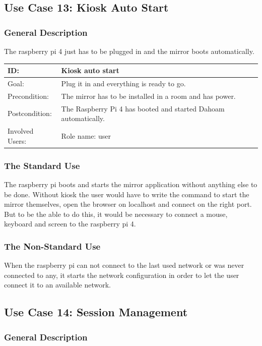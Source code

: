 \documentclass[12pt]{article}
\theoremstyle{definition}
\begin{document}
\subsection{Use Case 13: Kiosk Auto Start}
\subsubsection{General Description}
The raspberry pi 4 just has to be plugged in and the mirror boots automatically. \\

\begin{tabular}{|p{.2\linewidth}|p{.65\linewidth}|}
\hline 
ID: & Kiosk auto start\\ \hline
Goal: & Plug it in and everything is ready to go. \\ \hline
Precondition: & The mirror has to be installed in a room and has power. \\ \hline
Postcondition: &  The Raspberry Pi 4 has booted and started Dahoam automatically.\\ \hline
Involved Users: & Role name: user \\ \hline
\end{tabular}

\subsubsection{The Standard Use}
The raspberry pi boots and starts the mirror application without anything else to be done. Without kiosk the user would have to write the command to start the mirror themselves, open the browser on localhost and connect on the right port. But to be the able to do this, it would be necessary to connect a mouse, keyboard and screen to the  raspberry pi 4.

\subsubsection{The Non-Standard Use}
When the raspberry pi can not connect to the last used network or was never connected to any, it starts the network configuration in order to let the user connect it to an available network. 

\subsection{Use Case 14: Session Management}
\subsubsection{General Description}
\end{document}
